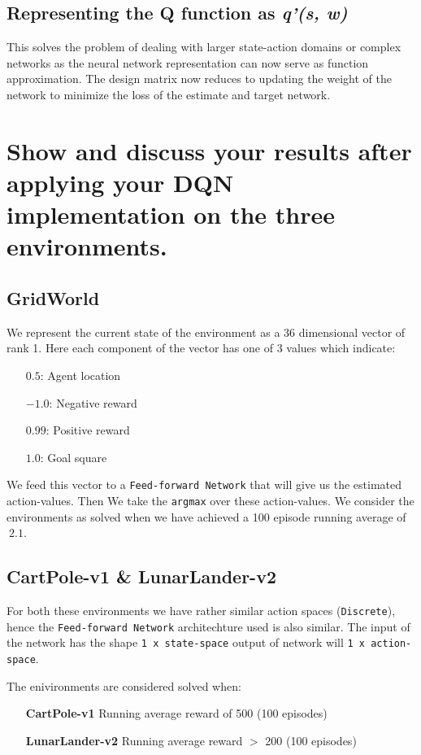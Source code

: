 \documentclass{article} %
\begin{document}
\subsection{Representing the Q function as \textit{q'(s, w)}}
This solves the problem of dealing with larger state-action domains or complex networks as the neural network representation can now serve  as  function approximation. The design matrix now reduces to updating the weight of the network to minimize the loss of the estimate and target network.

\section{Show and discuss your results after applying your DQN implementation on the three environments.}

\subsection{GridWorld}

We represent the current state of the environment as a 36 dimensional vector of rank 1. Here each
component of the vector has one of 3 values which indicate:

\begin{itemize}
    \item[$0.5$:] Agent location
    \item[$-1.0$:] Negative reward
    \item[$0.99$:] Positive reward
    \item[$1.0$:] Goal square
\end{itemize}

We feed this vector to a \verb|Feed-forward Network| that will give us the estimated
action-values. Then We take the \verb|argmax| over these action-values. We consider the
environments as solved when we have achieved a 100 episode running average of $~2.1$.

\subsection{CartPole-v1 \& LunarLander-v2}
For both these environments we have rather similar action spaces (\verb|Discrete|), hence the
\verb|Feed-forward Network| architechture used is also similar. The input of the network has the shape
\verb|1 x state-space| output of network will \verb|1 x action-space|.

The enivironments are considered solved when:
\begin{itemize}
    \item[] \textbf{CartPole-v1} Running average reward of 500 (100 episodes)
    \item[] \textbf{LunarLander-v2} Running average reward $>$ 200 (100 episodes)
\end{itemize}
\end{document}
